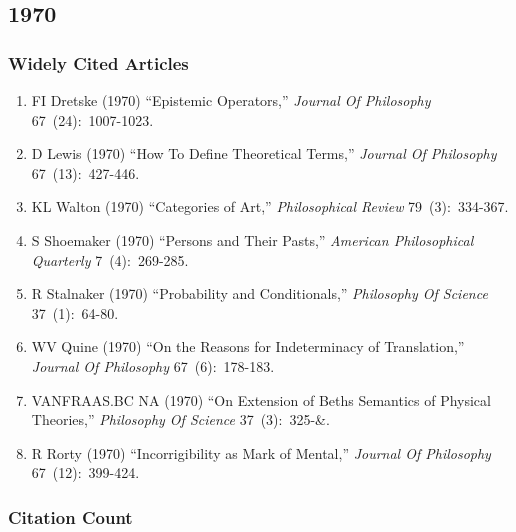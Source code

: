 \documentclass[
  10pt,
  letterpaper,
  DIV=11,
  numbers=noendperiod,
  twoside]{scrartcl}
\providecommand{\tightlist}{%
  \setlength{\itemsep}{0pt}\setlength{\parskip}{0pt}}\usepackage{longtable,booktabs,array}
\begin{document}
\newpage

\subsection{1970}\label{sec-s1970}

\subsubsection*{Widely Cited Articles}\label{widely-cited-articles-14}

\begin{enumerate}
\def\labelenumi{\arabic{enumi}.}
\tightlist
\item
  FI Dretske (1970) ``Epistemic Operators,'' \emph{Journal Of
  Philosophy} 67~(24):~1007-1023.
\item
  D Lewis (1970) ``How To Define Theoretical Terms,'' \emph{Journal Of
  Philosophy} 67~(13):~427-446.
\item
  KL Walton (1970) ``Categories of Art,'' \emph{Philosophical Review}
  79~(3):~334-367.
\item
  S Shoemaker (1970) ``Persons and Their Pasts,'' \emph{American
  Philosophical Quarterly} 7~(4):~269-285.
\item
  R Stalnaker (1970) ``Probability and Conditionals,'' \emph{Philosophy
  Of Science} 37~(1):~64-80.
\item
  WV Quine (1970) ``On the Reasons for Indeterminacy of Translation,''
  \emph{Journal Of Philosophy} 67~(6):~178-183.
\item
  VANFRAAS.BC NA (1970) ``On Extension of Beths Semantics of Physical
  Theories,'' \emph{Philosophy Of Science} 37~(3):~325-\&.
\item
  R Rorty (1970) ``Incorrigibility as Mark of Mental,'' \emph{Journal Of
  Philosophy} 67~(12):~399-424.
\end{enumerate}

\subsubsection*{Citation Count}\label{sec-count-1970}
\end{document}
